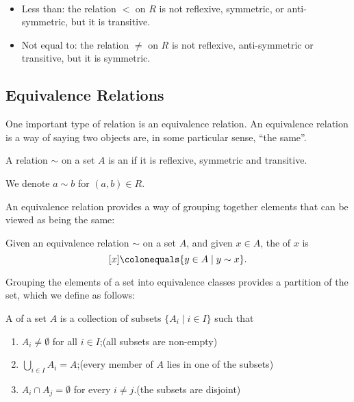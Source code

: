 \begin{example} \
\begin{itemize}
\item Less than: the relation $<$ on $R$ is not reflexive, symmetric, or anti-symmetric, but it is transitive.
\item Not equal to: the relation $\neq$ on $R$ is not reflexive, anti-symmetric or transitive, but it is symmetric.
\end{itemize}
\end{example}

\subsection{Equivalence Relations}
One important type of relation is an equivalence relation. An equivalence relation is a way of saying two objects are, in some particular sense, ``the same''.

\begin{definition}
A relation $\sim$ on a set $A$ is an  if it is reflexive, symmetric and transitive.
\end{definition}

\begin{notation}
We denote $a\sim b$ for $(a,b)\in R$.
\end{notation}

An equivalence relation provides a way of grouping together elements that can be viewed as being the same:

\begin{definition}
Given an equivalence relation $\sim$ on a set $A$, and given $x \in A$, the  of $x$ is
\[[x]\colonequals\{y\in A\mid y\sim x\}.\]
\end{definition}

Grouping the elements of a set into equivalence classes provides a partition of the set, which we define as follows:

\begin{definition}[Partition]
A  of a set $A$ is a collection of subsets $\{A_i\mid i\in I\}$ such that
\begin{enumerate}[label=(\roman*)]
\item $A_i\neq\emptyset$ for all $i\in I$;\hfill(all subsets are non-empty)
\item $\bigcup_{i\in I}A_i=A$;\hfill(every member of $A$ lies in one of the subsets)
\item $A_i\cap A_j=\emptyset$ for every $i\neq j$.\hfill(the subsets are disjoint)
\end{enumerate}
\end{definition}

